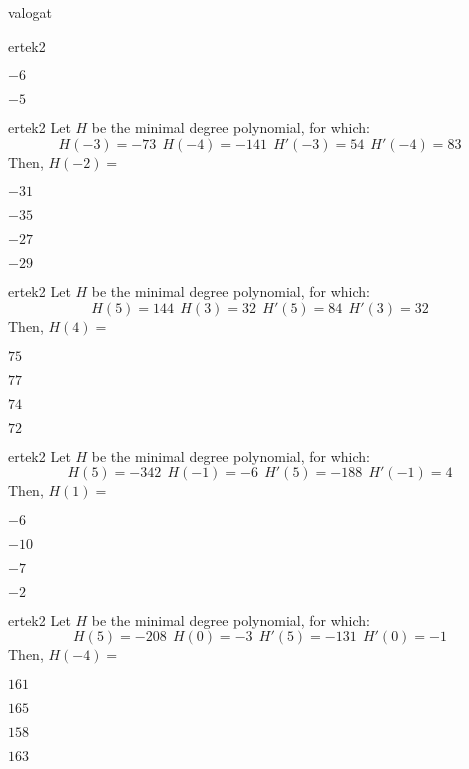 \documentclass[12pt]{article}
\begin{document}
\begin{quiz}{valogat}
\begin{multi}{ertek2}
\item  $ -6 $
\item  $ -5 $
\end{multi}\begin{multi}{ertek2}
Let $H$ be the minimal degree polynomial, for which:
$$
H(-3)=-73\ \ H(-4)=-141 \ \ H'(-3)=54 \ \ H'(-4)=83
$$
Then, $H(-2)=$
\item* $ -31 $
\item  $ -35 $
\item  $ -27 $
\item  $ -29 $
\end{multi}\begin{multi}{ertek2}
Let $H$ be the minimal degree polynomial, for which:
$$
H(5)=144\ \ H(3)=32 \ \ H'(5)=84 \ \ H'(3)=32
$$
Then, $H(4)=$
\item* $ 75 $
\item  $ 77 $
\item  $ 74 $
\item  $ 72 $
\end{multi}\begin{multi}{ertek2}
Let $H$ be the minimal degree polynomial, for which:
$$
H(5)=-342\ \ H(-1)=-6 \ \ H'(5)=-188 \ \ H'(-1)=4
$$
Then, $H(1)=$
\item* $ -6 $
\item  $ -10 $
\item  $ -7 $
\item  $ -2 $
\end{multi}\begin{multi}{ertek2}
Let $H$ be the minimal degree polynomial, for which:
$$
H(5)=-208\ \ H(0)=-3 \ \ H'(5)=-131 \ \ H'(0)=-1
$$
Then, $H(-4)=$
\item* $ 161 $
\item  $ 165 $
\item  $ 158 $
\item  $ 163 $
\end{multi}\end{quiz}
\end{document}
